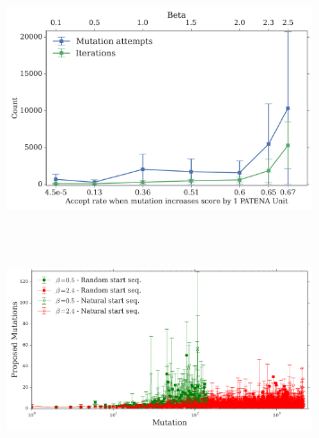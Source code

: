 \documentclass{beamer}
\begin{document}
\begin{frame}
\begin{adjustwidth}{-1.5em}{-2.5em}
\includegraphics[width=340px,height=250px]{../img/beta-vs-Mut-iterations}\\
\end{adjustwidth}
\end{frame}











\begin{frame}
\begin{adjustwidth}{-2.0em}{-2.0em}
\includegraphics[width=340px,height=250px]{../img/iterationVsMutAttempts-mean.png} 
\end{adjustwidth}
\end{frame}
\end{document}
